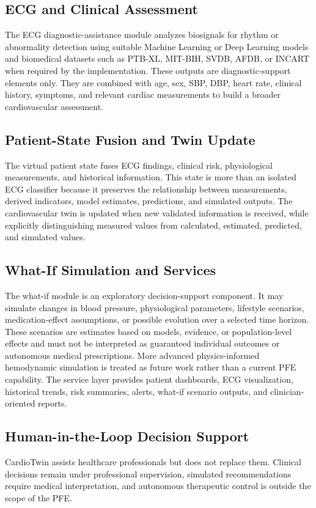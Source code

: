 \subsection{ECG and Clinical Assessment}
The ECG diagnostic-assistance module analyzes biosignals for rhythm or abnormality detection using suitable Machine Learning or Deep Learning models and biomedical datasets such as PTB-XL, MIT-BIH, SVDB, AFDB, or INCART when required by the implementation. These outputs are diagnostic-support elements only. They are combined with age, sex, SBP, DBP, heart rate, clinical history, symptoms, and relevant cardiac measurements to build a broader cardiovascular assessment.

\subsection{Patient-State Fusion and Twin Update}
The virtual patient state fuses ECG findings, clinical risk, physiological measurements, and historical information. This state is more than an isolated ECG classifier because it preserves the relationship between measurements, derived indicators, model estimates, predictions, and simulated outputs. The cardiovascular twin is updated when new validated information is received, while explicitly distinguishing measured values from calculated, estimated, predicted, and simulated values.

\subsection{What-If Simulation and Services}
The what-if module is an exploratory decision-support component. It may simulate changes in blood pressure, physiological parameters, lifestyle scenarios, medication-effect assumptions, or possible evolution over a selected time horizon. These scenarios are estimates based on models, evidence, or population-level effects and must not be interpreted as guaranteed individual outcomes or autonomous medical prescriptions. More advanced physics-informed hemodynamic simulation is treated as future work rather than a current PFE capability. The service layer provides patient dashboards, ECG visualization, historical trends, risk summaries, alerts, what-if scenario outputs, and clinician-oriented reports.

\subsection{Human-in-the-Loop Decision Support}
CardioTwin assists healthcare professionals but does not replace them. Clinical decisions remain under professional supervision, simulated recommendations require medical interpretation, and autonomous therapeutic control is outside the scope of the PFE.

